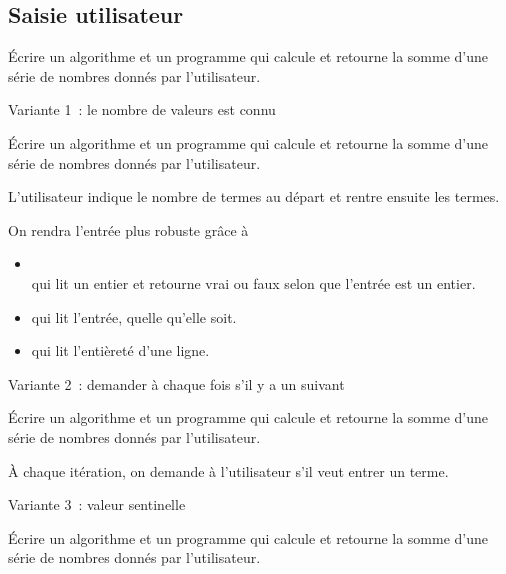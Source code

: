 \begin{hideedit}
\subsection{Saisie utilisateur}
\begin{frame}
  \begin{block}{}
    Écrire un algorithme et un programme qui calcule et retourne
    la somme d’une série de nombres donnés par l’utilisateur.
  \end{block}

\end{frame}

\begin{frame}{Variante 1~: le nombre de valeurs est connu}
  \begin{block}{}
    Écrire un algorithme et un programme qui calcule et retourne
    la somme d’une série de nombres donnés par l’utilisateur.
  \end{block}

  L'utilisateur indique le nombre de termes au départ et rentre ensuite les
  termes.

  \pause
  On rendra l'entrée plus \og robuste \fg grâce à
  \begin{itemize}
    \item {}\\
      qui lit un entier et retourne vrai ou faux selon que l'entrée est
      un entier.
    \item {} qui lit l'entrée, quelle qu'elle soit.
    \item {} qui lit l'entièreté d'une ligne.
  \end{itemize}
\end{frame}

\begin{frame}{Variante 2~: demander à chaque fois s'il y a un suivant}
  \begin{block}{}
    Écrire un algorithme et un programme qui calcule et retourne
    la somme d’une série de nombres donnés par l’utilisateur.
  \end{block}

  À chaque itération, on demande à l'utilisateur s'il veut entrer un terme.
\end{frame}

\begin{frame}{Variante 3~: valeur sentinelle}
  \begin{block}{}
    Écrire un algorithme et un programme qui calcule et retourne
    la somme d’une série de nombres donnés par l’utilisateur.
  \end{block}


\end{frame}
\end{hideedit}
